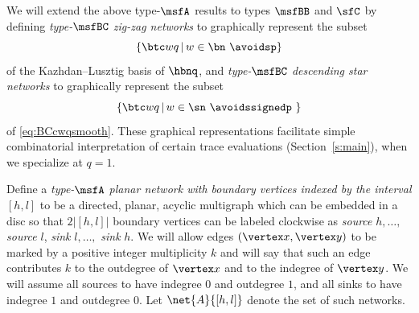 We will extend the above type-$\msfA$ results to types $\msfBB$ and $\sfC$
by defining {\em type-$\msfBC$ zig-zag networks}
to graphically represent the subset
\begin{equation}\label{eq:BCcwqsmooth}
  \{ \btc wq \,|\, w \in \bn \text{ \avoidsp} \}
\end{equation}
of the Kazhdan--Lusztig basis of $\hbnq$,
and {\em type-$\msfBC$ descending star networks}
to graphically represent the subset
\begin{equation}\label{eq:BCcwqcodom}
  \{ \btc wq \,|\, w \in \sn \text{ \avoidssignedp } \}
\end{equation}
of \eqref{eq:BCcwqsmooth}.
These graphical representations facilitate
simple combinatorial interpretation of certain trace evaluations
(Section~\ref{s:main}), when we specialize at $q=1$.


\label{ss:Aplanar}

Define a {\em type-$\msfA$ planar network with boundary vertices indexed by
the interval $[h,l]$}
to be a directed, planar,
acyclic multigraph which can be embedded in a disc so that
$2|[h,l]|$ boundary vertices can be labeled clockwise as
{\em source} $h, \dotsc,$ {\em source} $l$,
{\em sink} $l, \dotsc,$ {\em sink} $h$.
We will allow edges $(\vertex x, \vertex y)$
to be marked by a positive integer multiplicity $k$
and will say that such an edge contributes $k$ to the outdegree of $\vertex x$
and to the indegree of $\vertex y$.
We will assume all sources to have indegree $0$ and outdegree $1$,
and all sinks to have indegree $1$ and outdegree $0$.
Let $\net{A}{[h,l]}$ denote the set of such networks.

